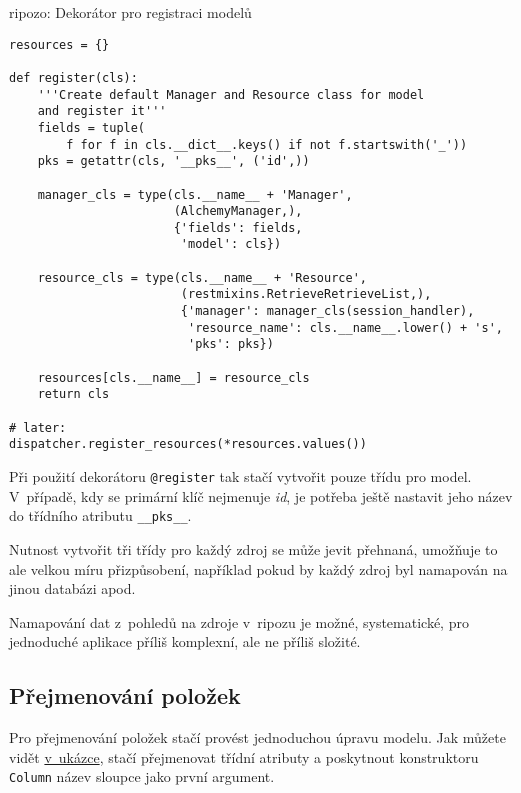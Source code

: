 \begin{listing}[htbp]
\caption{{\label{code:ripozo:register}ripozo: Dekorátor pro registraci modelů}}
\begin{verbatim}
resources = {}

def register(cls):
    '''Create default Manager and Resource class for model
    and register it'''
    fields = tuple(
        f for f in cls.__dict__.keys() if not f.startswith('_'))
    pks = getattr(cls, '__pks__', ('id',))

    manager_cls = type(cls.__name__ + 'Manager',
                       (AlchemyManager,),
                       {'fields': fields,
                        'model': cls})

    resource_cls = type(cls.__name__ + 'Resource',
                        (restmixins.RetrieveRetrieveList,),
                        {'manager': manager_cls(session_handler),
                         'resource_name': cls.__name__.lower() + 's',
                         'pks': pks})

    resources[cls.__name__] = resource_cls
    return cls

# later:
dispatcher.register_resources(*resources.values())
\end{verbatim}
\end{listing}

Při použití dekorátoru \verb!@register! tak stačí vytvořit pouze třídu pro model. V~případě, kdy se primární klíč nejmenuje \emph{id}, je potřeba ještě nastavit jeho název do třídního atributu \verb!__pks__!.

Nutnost vytvořit tři třídy pro každý zdroj se může jevit přehnaná, umožňuje to ale velkou míru přizpůsobení, například pokud by každý zdroj byl namapován na jinou databázi apod.

Namapování dat z~pohledů na zdroje v~ripozu je možné, systematické, pro jednoduché aplikace příliš komplexní, ale ne příliš složité.

\subsection{Přejmenování položek}\label{pux159ejmenovuxe1nuxed-poloux17eek}

Pro přejmenování položek stačí provést jednoduchou úpravu modelu. Jak můžete vidět \protect\hyperlink{code:ripozo:rename}{v~ukázce}, stačí přejmenovat třídní atributy a poskytnout konstruktoru \verb!Column! název sloupce jako první argument.

